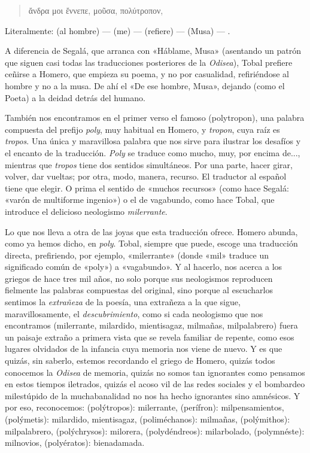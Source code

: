 \begin{verse}
\foreignlanguage{greek}{ἄνδρα μοι ἔννεπε, μοῦσα, πολύτροπον,}
\end{verse}

Literalmente:  (al hombre) ---  (me) ---  (refiere) ---  (Musa) --- .

A diferencia de Segalá, que arranca con «Háblame, Musa» (asentando un patrón que siguen casi todas las traducciones posteriores de la \emph{Odisea}), Tobal prefiere ceñirse a Homero, que empieza su poema, y no por casualidad, refiriéndose al hombre y no a la musa. De ahí el «De ese hombre, Musa», dejando (como el Poeta) a la deidad detrás del humano. 

También nos encontramos en el primer verso el famoso  (polytropon), una palabra compuesta del prefijo \emph{poly}, muy habitual en Homero, y \emph{tropon}, cuya raíz es \emph{tropos}. Una única y maravillosa palabra que nos sirve para ilustrar los desafíos y el encanto de la traducción. \emph{Poly} se traduce como mucho, muy, por encima de..., mientras que \emph{tropos} tiene dos sentidos simultáneos. Por una parte, hacer girar, volver, dar vueltas; por otra, modo, manera, recurso. El traductor al español tiene que elegir. O prima el sentido de «muchos recursos» (como hace Segalá: «varón de multiforme ingenio») o el de vagabundo, como hace Tobal, que introduce el delicioso neologismo \emph{milerrante}.  

Lo que nos lleva a otra de las joyas que esta traducción ofrece. Homero abunda, como ya hemos dicho, en \emph{poly}. Tobal, siempre que puede, escoge una traducción directa, prefiriendo, por ejemplo, «milerrante» (donde «mil» traduce un significado común de «poly») a «vagabundo». Y al hacerlo, nos acerca a los griegos de hace tres mil años, no solo porque sus neologismos reproducen fielmente las palabras compuestas del original, sino porque al escucharlos sentimos la \emph{extrañeza} de la poesía, una extrañeza a la que sigue, maravillosamente, el \emph{descubrimiento}, como si cada neologismo que nos encontramos (milerrante, milardido, mientisagaz, milmañas, milpalabrero) fuera un paisaje extraño a primera vista que se revela familiar de repente, como esos lugares olvidados de la infancia cuya memoria nos viene de nuevo. Y es que quizás, sin saberlo, estemos recordando el griego de Homero, quizás todos conocemos la \emph{Odisea} de memoria, quizás no somos tan ignorantes como pensamos en estos tiempos iletrados, quizás el acoso vil de las redes sociales y el bombardeo milestúpido de la muchabanalidad no nos ha hecho ignorantes sino amnésicos. Y por eso, reconocemos:  (polýtropos): milerrante,  (perífron): milpensamientos,  (polýmetis): milardido, mientisagaz,  (poliméchanos): milmañas,  (polýmithos): milpalabrero,  (polýchrysos): milorera,  (polydéndreos): milarbolado,  (polymnéste): milnovios,  (polyératos): bienadamada.

